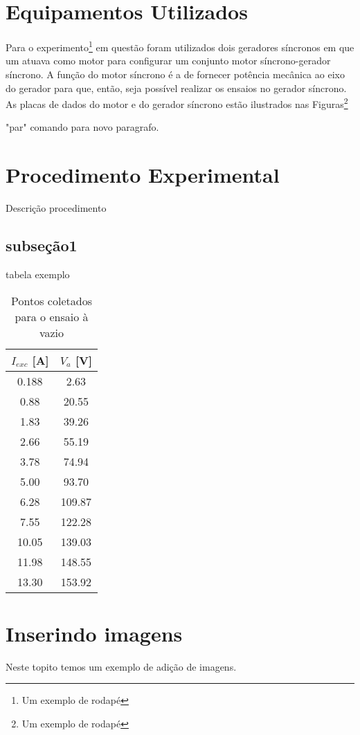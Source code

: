 \documentclass[a4paper, 12pt]{article}
\begin{document}
\section{Equipamentos Utilizados} 

Para o experimento\footnote{Um exemplo de rodapé} em questão foram utilizados dois geradores síncronos em que um atuava como motor para configurar um conjunto motor síncrono-gerador síncrono. A função do motor síncrono é a de fornecer potência mecânica ao eixo do gerador para que, então, seja possível realizar os ensaios no gerador síncrono. As placas de dados do motor e do gerador síncrono estão ilustrados nas Figuras\footnote{Um exemplo de rodapé}
\par "par" comando para novo paragrafo.


\section{Procedimento Experimental}

Descrição procedimento


\subsection{subseção1}
tabela exemplo

\begin{table}[htb]
\centering
\begin{tabular}{c|c}
$I_{exc}$ [A] & $V_{a}$ [V] \\ \hline
0.188	& 2.63 		\\\hline
0.88 & 20.55	\\\hline
1.83 & 39.26 \\\hline
2.66 & 55.19 \\\hline
3.78 & 74.94 \\\hline
5.00 & 93.70 \\\hline
6.28 & 109.87 \\\hline
7.55 & 122.28 \\\hline
10.05 & 139.03 \\\hline
11.98 & 148.55 \\\hline
13.30 & 153.92 

\end{tabular}
\caption{Pontos coletados para o ensaio à vazio}
\label{PTO:col_vazio}
\end{table}

\section{Inserindo imagens}
Neste topito temos um exemplo de adição de imagens.
\end{document}
